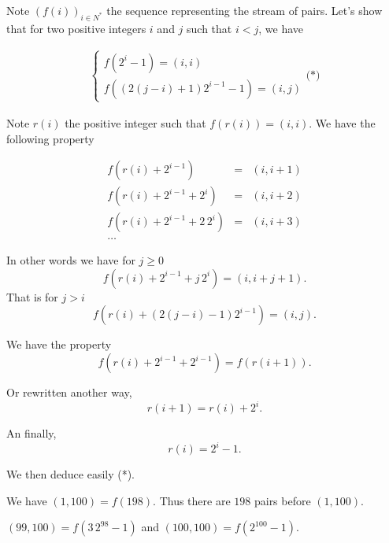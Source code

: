 \documentclass[a4paper,12pt]{article}
\begin{document}
Note $(f(i))_{i \in N^*}$ the sequence representing the stream of
pairs.  Let's show that for two positive integers $i$ and $j$ such
that $i <j$, we have

\begin{eqnarray*}
  \left\{
  \begin{array}{l}
    f(2^i-1) = (i, i) \\
    f((2(j-i)+1)2^{i-1}-1) = (i, j)
  \end{array}
  \right. \mbox{(*)}
\end{eqnarray*}

Note $r(i)$ the positive integer such that $f(r(i)) = (i, i)$.  We
have the following property

\begin{eqnarray*}
  f(r(i) + 2^{i-1}) &=& (i, i+1) \\
  f(r(i) + 2^{i-1} + 2^i) &=& (i, i+2) \\
  f(r(i) + 2^{i-1} + 2\,2^i) &=& (i, i+3) \\
  \ldots
\end{eqnarray*}

In other words we have for $j \ge 0$
\[ f(r(i) + 2^{i-1} + j\,2^i) = (i, i+j+1).\]
That is for $j > i$
\[ f(r(i) + (2(j-i)-1)2^{i-1}) = (i, j).\]

We have the property
\[ f(r(i) + 2^{i-1} + 2^{i-1}) = f(r(i+1)).\]

Or rewritten another way,
\[ r(i+1) = r(i) + 2^i.\]

An finally,
\[ r(i) = 2^i - 1.\]

We then deduce easily (*).

We have $(1, 100) = f(198)$.  Thus there are $198$ pairs before $(1,
100)$.

$(99, 100) = f(3\,2^{98} - 1)$ and $(100, 100) = f(2^{100}-1)$.
\end{document}
